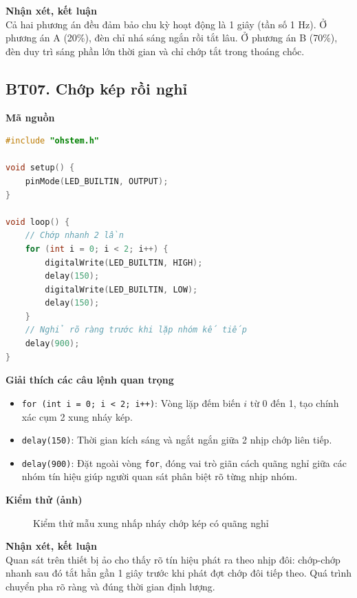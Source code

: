 \noindent\textbf{Nhận xét, kết luận}\\
Cả hai phương án đều đảm bảo chu kỳ hoạt động là 1 giây (tần số 1 Hz). Ở phương án A (20\%), đèn chỉ nhá sáng ngắn rồi tắt lâu. Ở phương án B (70\%), đèn duy trì sáng phần lớn thời gian và chỉ chớp tắt trong thoáng chốc.


\subsection*{BT07. Chớp kép rồi nghỉ}

\noindent\textbf{Mã nguồn}\\
\begin{lstlisting}[language=C]
#include "ohstem.h"

void setup() {
    pinMode(LED_BUILTIN, OUTPUT);
}

void loop() {
    // Chớp nhanh 2 lần
    for (int i = 0; i < 2; i++) {
        digitalWrite(LED_BUILTIN, HIGH);
        delay(150);
        digitalWrite(LED_BUILTIN, LOW);
        delay(150);
    }
    // Nghỉ rõ ràng trước khi lặp nhóm kế tiếp
    delay(900);
}
\end{lstlisting}

\noindent\textbf{Giải thích các câu lệnh quan trọng}\\
\begin{itemize}
    \item \texttt{for (int i = 0; i < 2; i++)}: Vòng lặp đếm biến $i$ từ 0 đến 1, tạo chính xác cụm 2 xung nháy kép.
    \item \texttt{delay(150)}: Thời gian kích sáng và ngắt ngắn giữa 2 nhịp chớp liên tiếp.
    \item \texttt{delay(900)}: Đặt ngoài vòng \texttt{for}, đóng vai trò giãn cách quãng nghỉ giữa các nhóm tín hiệu giúp người quan sát phân biệt rõ từng nhịp nhóm.
\end{itemize}

\noindent\textbf{Kiểm thử (ảnh)}\\
\begin{figure}[H]
    \centering
    \caption{Kiểm thử mẫu xung nhấp nháy chớp kép có quãng nghỉ}
    \label{fig:bt07}
\end{figure}

\noindent\textbf{Nhận xét, kết luận}\\
Quan sát trên thiết bị ảo cho thấy rõ tín hiệu phát ra theo nhịp đôi: chớp-chớp nhanh sau đó tắt hẳn gần 1 giây trước khi phát đợt chớp đôi tiếp theo. Quá trình chuyển pha rõ ràng và đúng thời gian định lượng.


